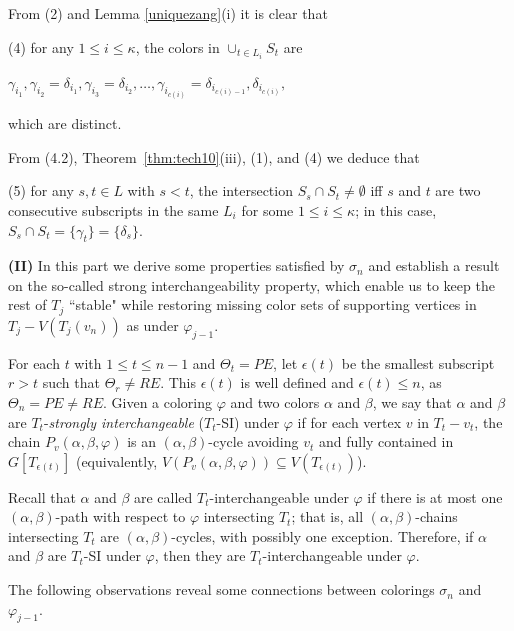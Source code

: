 \documentclass[11pt]{article}
\newcommand{\phiv}{\varphi}
\begin{document}
From (2) and Lemma \ref{uniquezang}(i) it is clear that  

(4) for any $1 \le i \le \kappa$, the colors in $\cup_{t\in L_i} S_t$ are 
\begin{center}
\vspace{-2mm}
$\gamma_{i_1}, \gamma_{i_2}=\delta_{i_1}, \gamma_{i_3}=\delta_{i_2}, \ldots, \gamma_{i_{c(i)}}=\delta_{i_{c(i)-1}}, \delta_{i_{c(i)}},$ 
\vspace{-2mm}
\end{center}
which are distinct. 

From (4.2), Theorem~\ref{thm:tech10}(iii), (1), and (4) we deduce that  

(5) for any $s,t\in L$ with $s<t$, the intersection $S_s\cap S_t\neq\emptyset$ iff $s$ and $t$ are two consecutive subscripts in the same $L_i$ for some 
$1\leq i\leq\kappa$; in this case, $S_s\cap S_t=\{\gamma_t\}=\{\delta_s\}$.

\vskip 2mm
{\bf (II)} In this part we derive some properties satisfied by $\sigma_{n}$ and establish a result on the so-called strong interchangeability 
property, which enable us to keep the rest of $T_j$ ``stable" while restoring missing color sets of supporting vertices in $T_j-
V(T_j(v_n))$ as under $\varphi_{j-1}$. 

For each $t$ with $1\le t \le n-1$ and $\Theta_t = PE$, let $\epsilon(t)$ be the smallest subscript $r>t$ such that 
$\Theta_r \ne RE$.  This $\epsilon(t)$ is well defined and $\epsilon(t) \le n$, as $\Theta_n = PE \ne RE$.  
Given a coloring $\phiv$ and two colors $\alpha$ and $\beta$, we say that  $\alpha$ and $\beta$ are $T_t$-{\em strongly interchangeable}\label{stronglyinterchange} 
($T_t$-SI) under $\varphi$ if for each vertex $v$ in $T_t-v_t$, the chain $P_v(\alpha, \beta, \phiv)$ is an $(\alpha, \beta)$-cycle avoiding 
$v_t$ and fully contained in $G[T_{\epsilon(t)}]$ (equivalently, $V(P_v(\alpha, \beta, \phiv)) \subseteq V(T_{\epsilon(t)})$). 

Recall that  $\alpha$ and $\beta$ are called $T_t$-interchangeable under $\varphi$ if there is at most one $(\alpha,\beta)$-path with respect 
to $\varphi$ intersecting $T_t$; that is, all $(\alpha, \beta)$-chains intersecting $T_t$ are $(\alpha, \beta)$-cycles, with possibly one
exception. Therefore, if $\alpha$ and $\beta$ are $T_t$-SI under $\varphi$, then they are $T_t$-interchangeable 
under $\varphi$.

The following observations reveal some connections between colorings $\sigma_n$ and $\varphi_{j-1}$.  
\end{document}
